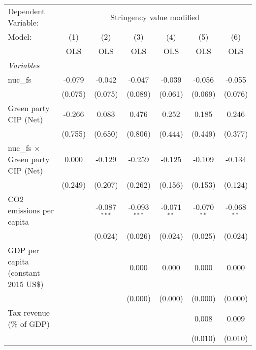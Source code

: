 
\begingroup
\centering
\begin{tabular}{lcccccc}
   \toprule
   Dependent Variable: & \multicolumn{6}{c}{Stringency value modified}\\
   Model:                                   & (1)     & (2)            & (3)            & (4)           & (5)           & (6)\\  
                                            &  OLS    & OLS            & OLS            & OLS           & OLS           & OLS\\  
   \midrule
   \emph{Variables}\\
   nuc\_fs                                  & -0.079  & -0.042         & -0.047         & -0.039        & -0.056        & -0.055\\   
                                            & (0.075) & (0.075)        & (0.089)        & (0.061)       & (0.069)       & (0.076)\\   
   Green party CIP (Net)                    & -0.266  & 0.083          & 0.476          & 0.252         & 0.185         & 0.246\\   
                                            & (0.755) & (0.650)        & (0.806)        & (0.444)       & (0.449)       & (0.377)\\   
   nuc\_fs $\times$ Green party CIP (Net)   & 0.000   & -0.129         & -0.259         & -0.125        & -0.109        & -0.134\\   
                                            & (0.249) & (0.207)        & (0.262)        & (0.156)       & (0.153)       & (0.124)\\   
   CO2 emissions per capita                 &         & -0.087$^{***}$ & -0.093$^{***}$ & -0.071$^{**}$ & -0.070$^{**}$ & -0.068$^{**}$\\   
                                            &         & (0.024)        & (0.026)        & (0.024)       & (0.025)       & (0.024)\\   
   GDP per capita (constant 2015 US\$)      &         &                & 0.000          & 0.000         & 0.000         & 0.000\\   
                                            &         &                & (0.000)        & (0.000)       & (0.000)       & (0.000)\\   
   Tax revenue (\% of GDP)                  &         &                &                &               & 0.008         & 0.009\\   
                                            &         &                &                &               & (0.010)       & (0.010)\\   

\end{tabular}
